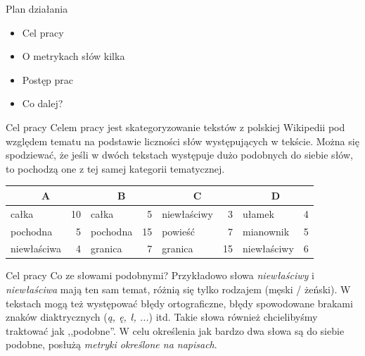 \documentclass[11pt,pdftex,mathserif]{beamer}\usepackage[]{graphicx}\usepackage[]{color}
\theoremstyle{definition}
\begin{document}



\begin{frame}{Plan działania}
\begin{itemize}
  \item Cel pracy
  \item O metrykach słów kilka
  \item Postęp prac
  \item Co dalej?
\end{itemize}
\end{frame}


\begin{frame}{Cel pracy}
Celem pracy jest skategoryzowanie tekstów z polskiej Wikipedii pod względem tematu na podstawie liczności słów występujących w tekście. Można się spodziewać, że jeśli w dwóch tekstach występuje dużo podobnych do siebie słów, to pochodzą one z tej samej kategorii tematycznej. \\
\pause
\begin{tabular}{ |l r|l r|l r|l r| }
  \hline
  \multicolumn{2}{|c|}{A} & \multicolumn{2}{|c|}{B} & \multicolumn{2}{|c|}{C} & \multicolumn{2}{|c|}{D} \\
  \hline
  całka & 10 & całka & 5 & niewłaściwy & 3 & ułamek & 4 \\
  pochodna & 5 & pochodna & 15 & powieść & 7 & mianownik & 5 \\
  niewłaściwa & 4 & granica & 7 & granica & 15 & niewłaściwy & 6 \\
  \hline
\end{tabular}
\end{frame}


\begin{frame}{Cel pracy}
Co ze słowami podobnymi? Przykładowo słowa \emph{niewłaściwy} i \emph{niewłaściwa} mają ten sam temat, różnią się tylko rodzajem (męski / żeński). W tekstach mogą też występować błędy ortograficzne, błędy spowodowane brakami znaków diaktrycznych (\emph{ą, ę, ł, ...}) itd. Takie słowa również chcielibyśmy traktować jak ,,podobne''. W celu określenia jak bardzo dwa słowa są do siebie podobne, posłużą \emph{metryki określone na napisach}.
\end{frame}
\end{document}
